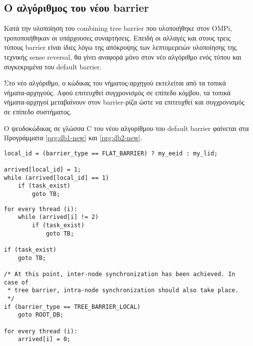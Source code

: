 \subsection{Ο αλγόριθμος του νέου barrier}
Κατά την υλοποίηση του combining tree barrier που υλοποιήθηκε στον OMPi, τροποποιήθηκαν οι υπάρχουσες συναρτήσεις. Επειδή οι αλλαγές και στους τρεις τύπους barrier είναι ίδιες λόγω της απόκρυψης των λεπτομερειών υλοποίησης της τεχνικής sense reversal, θα γίνει αναφορά μόνο στον νέο αλγόριθμο ενός τύπου και συγκεκριμένα του default barrier.

Στο νέο αλγόριθμο, ο κώδικας του νήματος-αρχηγού εκτελείται από τα τοπικά νήματα-αρχηγούς. Αφού επιτευχθεί συγχρονισμός σε επίπεδο κόμβου, τα τοπικά νήματα-αρχηγοί μεταβαίνουν στον barrier-ρίζα ώστε να επιτευχθεί και συγχρονισμός σε επίπεδο συστήματος.

Ο ψευδοκώδικας σε γλώσσα C του νέου αλγορίθμου του default barrier φαίνεται στα Προγράμματα \ref{prg:db1-new} και \ref{prg:db2-new}.

\begin{lstlisting}[label=prg:db1-new, caption=Ο νέος default barrier για όλα τα νήματα πλην των τοπικών νημάτων-αρχηγών.]
local_id = (barrier_type == FLAT_BARRIER) ? my_eeid : my_lid;

arrived[local_id] = 1;
while (arrived[local_id] == 1)
    if (task_exist)
        goto TB;
\end{lstlisting}

\begin{lstlisting}[label=prg:db2-new, caption=Ο νέος default barrier για τα τοπικά νήματα-αρχηγούς.]
for every thread (i):
    while (arrived[i] != 2)
        if (task_exist)
            goto TB;

if (task_exist)
    goto TB;

/* At this point, inter-node synchronization has been achieved. In case of
 * tree barrier, intra-node synchronization should also take place.
 */
if (barrier_type == TREE_BARRIER_LOCAL)
    goto ROOT_DB;

for every thread (i):
    arrived[i] = 0;
\end{lstlisting}

